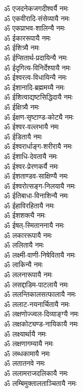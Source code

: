 \begin{multicols}{2}
\begin{flushleft}
ॐ एजदनेकजगदीश्वर्यै नमः\\
ॐ एकवीरादि-संसेव्यायै नमः\\
ॐ एकप्राभव-शालिन्यै नमः\hfill {}\\
ॐ ईकाररूपायै नमः\\
ॐ ईशित्र्यै नमः\\
ॐ ईप्सितार्थ-प्रदायिन्यै नमः\\
ॐ ईदृगित्य-विनिर्देश्यायै नमः\\
ॐ ईश्वरत्व-विधायिन्यै नमः\\
ॐ ईशानादि-ब्रह्ममय्यै नमः\\
ॐ ईशित्वाद्यष्टसिद्धिदायै नमः\\
ॐ ईक्षित्र्यै नमः\\
ॐ ईक्षण-सृष्टाण्ड-कोट्यै नमः\\
ॐ ईश्वर-वल्लभायै नमः\hfill {}\\
ॐ ईडितायै नमः\\
ॐ ईश्वरार्धाङ्ग-शरीरायै नमः\\
ॐ ईशाधि-देवतायै नमः\\
ॐ ईश्वर-प्रेरणकर्यै नमः\\
ॐ ईशताण्डव-साक्षिण्यै नमः\\
ॐ ईश्वरोत्सङ्ग-निलयायै नमः\\
ॐ ईतिबाधा-विनाशिन्यै नमः\\
ॐ ईहाविरहितायै नमः\\
ॐ ईशशक्त्यै नमः\\
ॐ ईषत्-स्मिताननायै नमः\hfill {}\\
ॐ लकाररूपायै नमः\\
ॐ ललितायै नमः\\
ॐ लक्ष्मी-वाणी-निषेवितायै नमः\\
ॐ लाकिन्यै नमः\\
ॐ ललनारूपायै नमः\\
ॐ लसद्दाडिम-पाटलायै नमः\\
ॐ ललन्तिकालसत्फालायै नमः\\
ॐ ललाट-नयनार्चितायै नमः\\
ॐ लक्षणोज्ज्वल-दिव्याङ्ग्यै नमः\\
ॐ लक्षकोट्यण्ड-नायिकायै नमः\hfill {}\\
ॐ लक्ष्यार्थायै नमः\\
ॐ लक्षणागम्यायै नमः\\
ॐ लब्धकामायै नमः\\
ॐ लतातनवे नमः\\
ॐ ललामराजदलिकायै नमः\\
ॐ लम्बिमुक्तालताञ्चितायै नमः\\

\end{flushleft}
\end{multicols}
